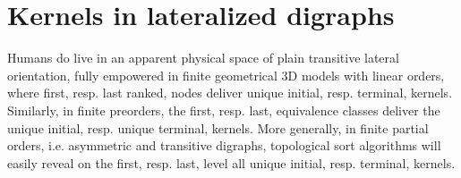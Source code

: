 \section{Kernels in lateralized digraphs}
\label{sec:17.3}

Humans do live in an apparent physical space of plain transitive lateral orientation, fully empowered in finite geometrical 3D models with linear orders, where first, resp. last ranked, nodes deliver unique initial, resp. terminal, kernels. Similarly, in finite preorders, the first, resp. last, equivalence classes deliver the unique initial, resp. unique terminal, kernels. More generally, in finite partial orders, i.e. asymmetric and transitive digraphs, topological sort algorithms will easily reveal on the first, resp. last, level all unique initial, resp. terminal, kernels.

